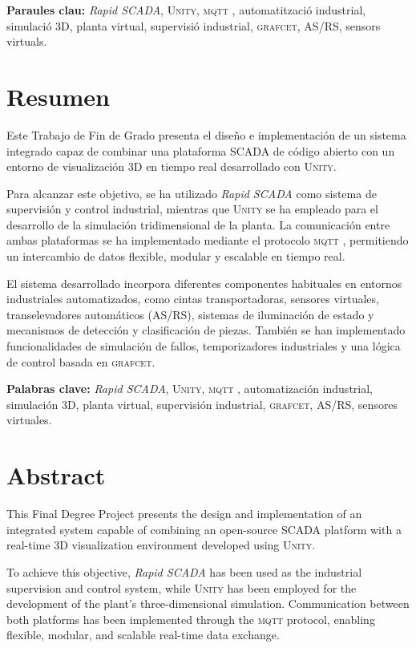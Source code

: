 \documentclass[a4paper,11pt,DIV=13,headings=normal,abstract=true,twoside=semi]{article}
\newcommand{\acro}[1]{\textsc{#1}}
\begin{document}
\bigskip

\textbf{Paraules clau:} \emph{Rapid SCADA}, \acro{Unity}, \acro{mqtt} , automatització industrial, simulació 3D, planta virtual, supervisió industrial, \acro{grafcet}, \acro{AS/RS}, sensors virtuals.



\section*{Resumen}

Este Trabajo de Fin de Grado presenta el diseño e implementación de un sistema integrado capaz de combinar una plataforma \acro{SCADA} de código abierto con un entorno de visualización 3D en tiempo real desarrollado con \acro{Unity}.

Para alcanzar este objetivo, se ha utilizado \emph{Rapid SCADA} como sistema de supervisión y control industrial, mientras que \acro{Unity} se ha empleado para el desarrollo de la simulación tridimensional de la planta. La comunicación entre ambas plataformas se ha implementado mediante el protocolo \acro{mqtt} , permitiendo un intercambio de datos flexible, modular y escalable en tiempo real.

El sistema desarrollado incorpora diferentes componentes habituales en entornos industriales automatizados, como cintas transportadoras, sensores virtuales, transelevadores automáticos (\acro{AS/RS}), sistemas de iluminación de estado y mecanismos de detección y clasificación de piezas. También se han implementado funcionalidades de simulación de fallos, temporizadores industriales y una lógica de control basada en \acro{grafcet}.

\bigskip

\textbf{Palabras clave:} \emph{Rapid SCADA}, \acro{Unity}, \acro{mqtt} , automatización industrial, simulación 3D, planta virtual, supervisión industrial, \acro{grafcet}, \acro{AS/RS}, sensores virtuales.


\section*{Abstract}

This Final Degree Project presents the design and implementation of an integrated system capable of combining an open-source \acro{SCADA} platform with a real-time 3D visualization environment developed using \acro{Unity}.

To achieve this objective, \emph{Rapid SCADA} has been used as the industrial supervision and control system, while \acro{Unity} has been employed for the development of the plant's three-dimensional simulation. Communication between both platforms has been implemented through the \acro{mqtt}  protocol, enabling flexible, modular, and scalable real-time data exchange.
\end{document}

